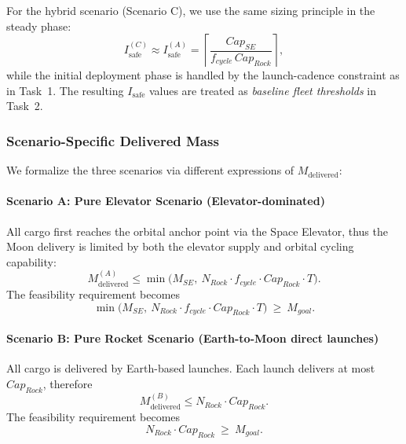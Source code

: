 ﻿\documentclass{mcmthesis}
\begin{document}
For the hybrid scenario (Scenario C), we use the same sizing principle in the steady phase:
\begin{equation}
I_{\text{safe}}^{(C)} \approx I_{\text{safe}}^{(A)}
=
\left\lceil
\frac{Cap_{SE}}{f_{cycle}\,Cap_{Rock}}
\right\rceil ,
\end{equation}
while the initial deployment phase is handled by the launch-cadence constraint as in Task~1.
The resulting $I_{\text{safe}}$ values are treated as \emph{baseline fleet thresholds} in Task~2.

\subsubsection{Scenario-Specific Delivered Mass}
We formalize the three scenarios via different expressions of $M_{\mathrm{delivered}}$:

\paragraph{Scenario A: Pure Elevator Scenario (Elevator-dominated)}
All cargo first reaches the orbital anchor point via the Space Elevator, thus the Moon
delivery is limited by both the elevator supply and orbital cycling capability:
\begin{equation}
M_{\mathrm{delivered}}^{(A)} \le \min\Big(M_{SE},\ N_{Rock}\cdot f_{cycle}\cdot Cap_{Rock}\cdot T \Big).
\end{equation}
The feasibility requirement becomes
\begin{equation}
\min\Big(M_{SE},\ N_{Rock}\cdot f_{cycle}\cdot Cap_{Rock}\cdot T \Big)\ \ge\ M_{goal}.
\end{equation}

\paragraph{Scenario B: Pure Rocket Scenario (Earth-to-Moon direct launches)}
All cargo is delivered by Earth-based launches. Each launch delivers at most $Cap_{Rock}$,
therefore
\begin{equation}
M_{\mathrm{delivered}}^{(B)} \le N_{Rock}\cdot Cap_{Rock}.
\end{equation}
The feasibility requirement becomes
\begin{equation}
N_{Rock}\cdot Cap_{Rock}\ \ge\ M_{goal}.
\end{equation}
\end{document}
